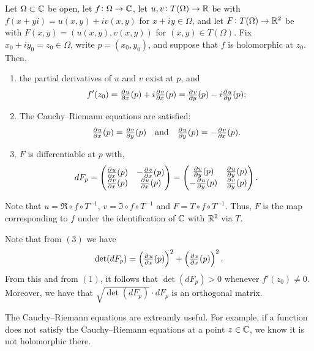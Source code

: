 \documentclass[11pt,a4paper]{article}
\begin{document}
\renewcommand*{\arraystretch}{1.25}
\begin{proposition}
  \label{prop:pd}
  Let $\Omega \subset \mathbb{C}$ be open, let $f \colon \Omega \to \mathbb{C}$, let 
  $u,v \colon T(\Omega) \to \mathbb{R}$ be with $f(x + y i) = u(x,y) + i v(x,y)$
  for $x + i y \in \Omega$, and let $F \colon T(\Omega) \to \mathbb{R}^2$ be with
  $F(x,y) = (u(x,y), v(x,y))$ for $(x,y) \in T(\Omega)$.
  Fix $x_0 + i y_0 = z_0 \in \Omega$,
  write $p = (x_0, y_0)$, and suppose that $f$ is holomorphic at $z_0$.
  Then,
  \begin{enumerate}
    \item[(1)] the partial derivatives of $u$ and $v$ exist at $p$, and
      \[
        f'(z_0) =
        \pd{u}{x}(p) + i \pd{v}{x}(p) =
        \pd{v}{y}(p) - i \pd{u}{y}(p);
      \]
    \item[(2)] The Cauchy--Riemann equations are satisfied:
      \[
        \pd{u}{x}(p) = \pd{v}{y}(p) \tand
        \pd{u}{y}(p) = -\pd{v}{x}(p).
      \]
    \item[(3)] $F$ is differentiable at $p$ with,
      \[
        dF_p =
        \begin{pmatrix}
          \pd{u}{x}(p) & - \pd{v}{x}(p) \\
          \pd{v}{x}(p) & \pd{u}{x}(p) 
        \end{pmatrix} =
        \begin{pmatrix}
          \pd{v}{y}(p) & \pd{u}{y}(p) \\
          - \pd{u}{y}(p) & \pd{v}{y}(p) 
        \end{pmatrix}.
      \]
  \end{enumerate}
\end{proposition}

\begin{remark}
  Note that $u = \Re \circ f \circ T^{-1}$, $v = \Im \circ f \circ T^{-1}$
  and $F = T \circ f \circ T^{-1}$.
  Thus, $F$ is the map corresponding to $f$ under the identification of $\mathbb{C}$ 
  with $\mathbb{R}^2$ via $T$.
\end{remark}

\begin{remark}
  Note that from $(3)$ we have
  \[
    \det(dF_p) = \del{\pd{u}{x}(p)}^2 + \del{\pd{v}{x}(p)}^2.
  \]
  From this and from $(1)$, it follows that $\det(dF_p) > 0$ whenever
  $f'(z_0) \neq 0$.
  Moreover, we have that $\sqrt{\det(dF_p)} \cdot dF_p$ is an orthogonal
  matrix.
\end{remark}
\begin{remark}
  The Cauchy--Riemann equations are extreamly useful.
  For example, if a function does not satisfy the Cauchy--Riemann equations
  at a point $z \in \mathbb{C}$, we know it is not holomorphic there.
\end{remark}
\end{document}
